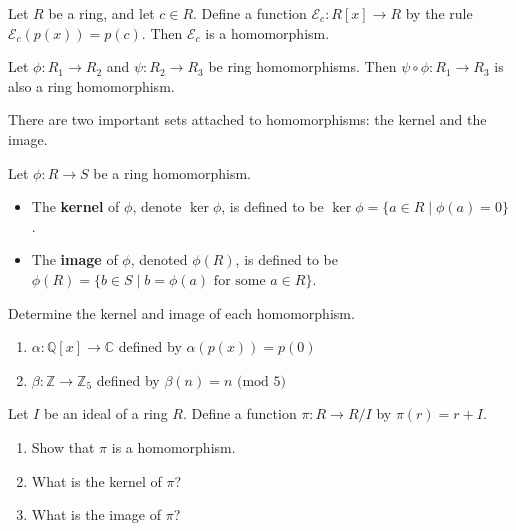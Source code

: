 \begin{theorem}\label{thm.EvalHom}
Let $R$ be a ring, and let $c\in R$. Define a function $\mathcal{E}_c:R[x] \rightarrow R$ by the rule $\mathcal{E}_c(p(x)) = p(c)$. Then $\mathcal{E}_c$ is a homomorphism.
\end{theorem}


\begin{theorem}
Let $\phi:R_1\to R_2$ and $\psi:R_2\to R_3$ be ring homomorphisms. Then $\psi\circ\phi:R_1 \to R_3$ is also a ring homomorphism.
\end{theorem}

There are two  important sets attached to homomorphisms: the kernel and the image.

\begin{definition}
Let $\phi:R\to S$ be a ring homomorphism. 
\begin{itemize}
\item The \textbf{kernel} of $\phi$, denote $\ker \phi$, is defined to be $\ker \phi=\{a\in R\mid \phi(a)=0\}$. 
\item The \textbf{image} of $\phi$, denoted  $\phi(R)$, is defined to be $\phi(R)=\{b\in S\mid b=\phi(a) \text{ for some $a\in R$}\}$.
\end{itemize}
\end{definition}

\begin{problem}
Determine the kernel and image of each homomorphism.
\begin{enumerate}
\item $\alpha: \mathbb{Q}[x] \rightarrow \mathbb{C}$ defined by $\alpha(p(x)) = p(0)$
\item $\beta: \mathbb{Z} \rightarrow \mathbb{Z}_5$ defined by $\beta(n) = n \text{ (mod $5$)}$
\end{enumerate}
\end{problem}

\begin{problem}\label{prob.NaturalProjection}
Let $I$ be an ideal of a ring $R$. Define a function $\pi:R \rightarrow R/I$ by $\pi(r) = r+I$.
\begin{enumerate}
\item Show that $\pi$ is a homomorphism. %
\item What is the kernel of $\pi$?
\item What is the image of $\pi$?
\end{enumerate}
\end{problem}

